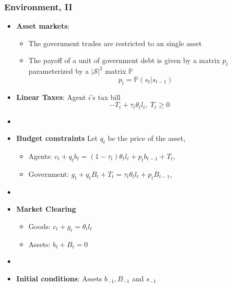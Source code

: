 \documentclass{beamer}
\begin{document}
\begin{frame}
 \frametitle{Environment, II}
 \begin{itemize}
\item \textbf{Asset markets}: 
\begin{itemize}
 \item The government trades are restricted to an single asset
\item The payoff of a unit of government debt is given by a matrix $p_t$ parameterized by a $|\mathcal{S}|^2$ matrix $\mathbb{P}$
\[p_t=\mathbb{P}(s_{t}|s_{t-1})\]
\end{itemize}



  \item \textbf{Linear Taxes}: Agent $i$'s tax bill
\[- T_t + \tau_t \theta_{t}l_{t},  \ T_t \geq 0 \]

\item[]
  \item \textbf{Budget constraints} Let $q_t$ be the price of the asset,
  
  \begin{itemize}
   \item Agents: $ c_{t}+q_tb_{t}=\left( 1-\tau _{t}\right) \theta _{t}l_{t}+p_{t}b_{t-1}+T_{t},$ %
  \item Government: $g_{t}+q_tB_{t}+T_t=\tau _{t}\theta_{t}l_{t}+p_{t}B_{t-1}, $%
  \end{itemize}

\item[]
  \item \textbf{Market Clearing}
  \begin{itemize}
   \item Goods: $c_{t}+g_t = \theta _{t} l_{t}$

   \item Assets: $b_{t}+B_{t}=0$
\end{itemize}
  \item[]

\item \textbf{Initial conditions}: Assets $b_{-1}, B_{-1}$ and  $s_{-1}$
\end{itemize}

\end{frame}
\end{document}
